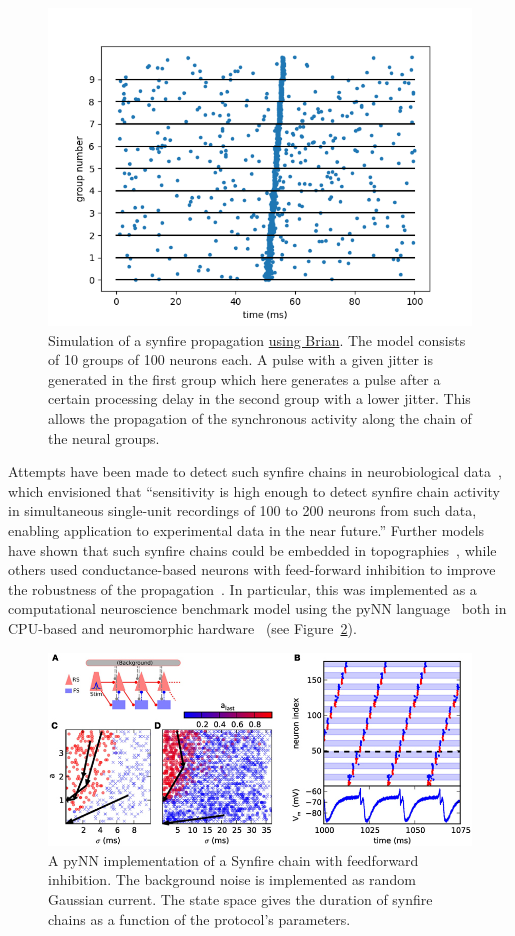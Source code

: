 \documentclass[brainsci, %
               review,submit,pdftex,moreauthors%
               ]{Definitions/mdpi}
\begin{document}
\begin{figure}
\centering
\includegraphics[width=.4\textwidth]{figures/Diesmann_et_al_1999.png}
\caption{Simulation of a synfire propagation \href{https://brian2.readthedocs.io/en/stable/examples/frompapers.Diesmann_et_al_1999.html}{using Brian}. The model consists of 10 groups of 100 neurons each. A pulse with a given jitter is generated in the first group which here generates a pulse after a certain processing delay in the second group with a lower jitter. This allows the propagation of the synchronous activity along the chain of the neural groups.}\label{fig:diesman}
\end{figure}
Attempts have been made to detect such synfire chains in neurobiological data~\citep{schrader_detecting_2008}, which envisioned that ``sensitivity is high enough to detect synfire chain activity in simultaneous single-unit recordings of 100 to 200 neurons from such data, enabling application to experimental data in the near future.'' Further models have shown that such synfire chains could be embedded in topographies~\citep{aviel_embedding_2003}, while others used conductance-based neurons with feed-forward inhibition to improve the robustness of the propagation~\citep{kremkow_functional_2010}. In particular, this was implemented as a computational neuroscience benchmark model using the pyNN language~\citep{davison_pynn_2008} both in CPU-based and neuromorphic hardware~\citep{pfeil_six_2013} (see Figure~\ref{fig:pynn}).
%
\begin{figure}
\centering
\includegraphics[width=.7\textwidth]{figures/fnins-07-00011-g004.jpg}
\caption{A pyNN implementation of a Synfire chain with feedforward inhibition. The background noise  is implemented as random Gaussian current. The state space gives the duration of synfire chains as a function of the protocol's parameters.}\label{fig:pynn}
\end{figure}
\end{document}
